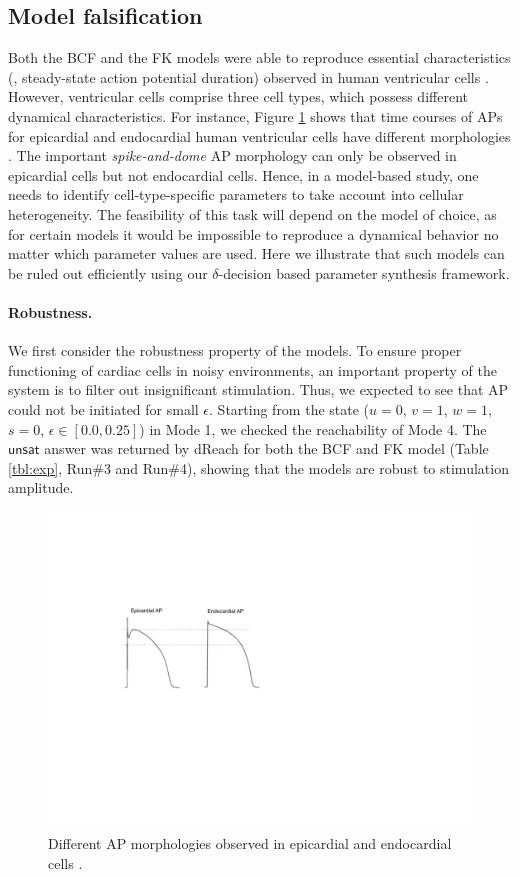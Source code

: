 \subsection{Model falsification}
Both the BCF and the FK models were able to reproduce essential characteristics (\eg, steady-state action potential duration) observed in human ventricular cells \cite{fenton98,orovio08}. However, ventricular cells comprise three cell types, which possess different dynamical characteristics. For instance, Figure \ref{ap} shows that time courses of APs for epicardial and endocardial human ventricular cells have different morphologies \cite{nabauer96}. The important \textit{spike-and-dome} AP morphology can only be observed in epicardial cells but not endocardial cells. Hence, in a model-based study, one needs to identify cell-type-specific parameters to take account into cellular heterogeneity. The feasibility of this task will depend on the model of choice, as for certain models it would be impossible to reproduce a dynamical behavior no matter which parameter values are used. Here we illustrate that such models can be ruled out efficiently using our $\delta$-decision based parameter synthesis framework.

\paragraph{Robustness.}
We first consider the robustness property of the models. To ensure proper functioning of cardiac cells in noisy environments, an important property of the system is to filter out insignificant stimulation. Thus, we expected to see that AP could not be initiated for small $\epsilon$. Starting from the state ($u = 0$, $v = 1$, $w = 1$, $s = 0$, $\epsilon \in [0.0,0.25]$) in Mode 1, we checked the reachability of Mode 4. The $\mathsf{unsat}$ answer was returned by dReach for both the BCF and FK
model (Table \ref{tbl:exp}, Run\#3 and Run\#4), showing that the models are robust to stimulation amplitude.

\begin{figure}[th]
\centering
\includegraphics[scale=0.8]{fig-ap}
\caption{Different AP morphologies observed in epicardial and endocardial cells \cite{nabauer96}.}
\label{ap}
\vspace{-0.7cm}
\end{figure}

